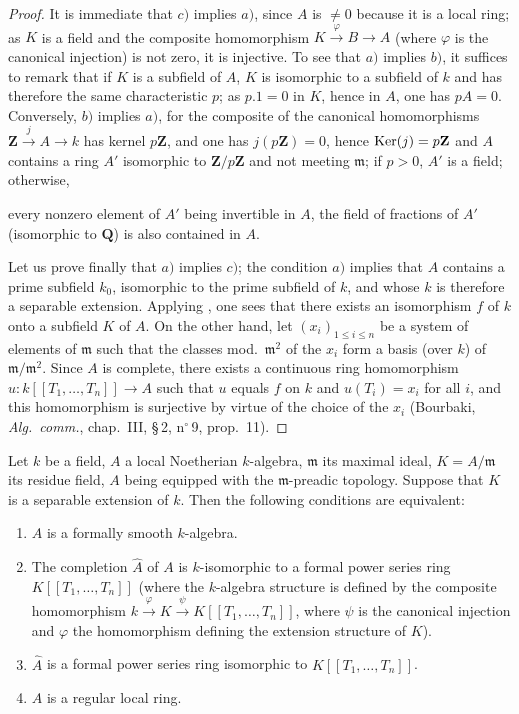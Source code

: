 \begin{proof}
It is immediate that $c)$ implies $a)$, since $A$ is $\neq 0$ because it is a local ring;
as $K$ is a field and the composite homomorphism $K\xrightarrow{\varphi}B\to A$ (where $\varphi$ is the canonical injection) is not zero, it is injective.
To see that $a)$ implies $b)$, it suffices to remark that if $K$ is a subfield of $A$, $K$ is isomorphic to a subfield of $k$ and has therefore the same characteristic $p$;
as $p.1=0$ in $K$, hence in $A$, one has $pA=0$.
Conversely, $b)$ implies $a)$, for the composite of the canonical homomorphisms $\mathbf{Z}\xrightarrow{j}A\to k$ has kernel $p\mathbf{Z}$, and one has $j(p\mathbf{Z})=0$, hence $\operatorname{Ker}(j)=p\mathbf{Z}$ and $A$ contains a ring $A'$ isomorphic to $\mathbf{Z}/p\mathbf{Z}$ and not meeting $\mathfrak{m}$;
if $p>0$, $A'$ is a field; otherwise,


every nonzero element of $A'$ being invertible in $A$, the field of fractions of $A'$ (isomorphic to $\mathbf{Q}$) is also contained in $A$.

Let us prove finally that $a)$ implies $c)$;
the condition $a)$ implies that $A$ contains a prime subfield $k_0$, isomorphic to the prime subfield of $k$, and whose $k$ is therefore a separable extension.
Applying , one sees that there exists an isomorphism $f$ of $k$ onto a subfield $K$ of $A$.
On the other hand, let $(x_i)_{1\leq i\leq n}$ be a system of elements of $\mathfrak{m}$ such that the classes mod.\ $\mathfrak{m}^2$ of the $x_i$ form a basis (over $k$) of $\mathfrak{m}/\mathfrak{m}^2$.
Since $A$ is complete, there exists a continuous ring homomorphism $u:k[[T_1,\ldots,T_n]]\to A$ such that $u$ equals $f$ on $k$ and $u(T_i)=x_i$ for all $i$, and this homomorphism is surjective by virtue of the choice of the $x_i$ (Bourbaki, \emph{Alg.\ comm.}, chap.~III, \S\,2, n$^\circ$\,9, prop.~11).
\end{proof}

\begin{theorem}[19.6.4]
\label{0.19.6.4}
Let $k$ be a field, $A$ a local Noetherian $k$-algebra, $\mathfrak{m}$ its maximal ideal, $K=A/\mathfrak{m}$ its residue field, $A$ being equipped with the $\mathfrak{m}$-preadic topology.
Suppose that $K$ is a separable extension of $k$.
Then the following conditions are equivalent:
\begin{enumerate}
  \item[a)] $A$ is a formally smooth $k$-algebra.
  \item[b)] The completion $\widehat{A}$ of $A$ is $k$-isomorphic to a formal power series ring $K[[T_1,\ldots,T_n]]$ (where the $k$-algebra structure is defined by the composite homomorphism $k\xrightarrow{\varphi}K\xrightarrow{\psi}K[[T_1,\ldots,T_n]]$, where $\psi$ is the canonical injection and $\varphi$ the homomorphism defining the extension structure of $K$).
  \item[b')] $\widehat{A}$ is a formal power series ring isomorphic to $K[[T_1,\ldots,T_n]]$.
  \item[c)] $A$ is a regular local ring.
\end{enumerate}
\end{theorem}


